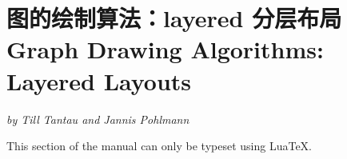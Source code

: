 %
%
%


\section{图的绘制算法：layered 分层布局 Graph Drawing Algorithms: Layered Layouts}

{\emph{by Till Tantau and Jannis Pohlmann}}

\ifluatex
\else
    This section of the manual can only be typeset using Lua\TeX.
    \expandafter\endinput
\fi

\includeluadocumentationof{pgf.gd.layered.library}
\includeluadocumentationof{pgf.gd.layered.Sugiyama}
\includeluadocumentationof{pgf.gd.layered.cycle_removal}
\includeluadocumentationof{pgf.gd.layered.node_ranking}
\includeluadocumentationof{pgf.gd.layered.crossing_minimization}
\includeluadocumentationof{pgf.gd.layered.node_positioning}
\includeluadocumentationof{pgf.gd.layered.edge_routing}


